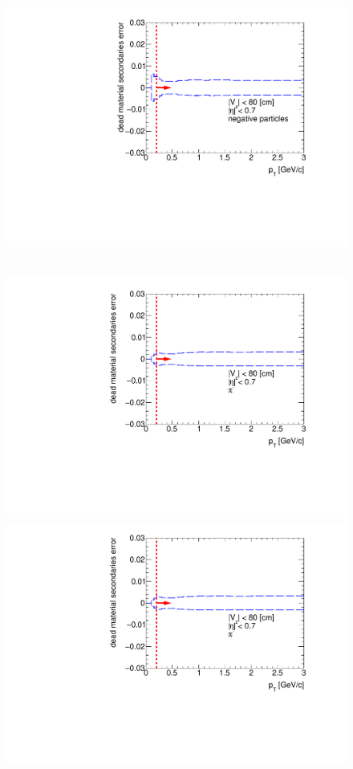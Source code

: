 \begin{figure}[hb]
{  \includegraphics[width=\linewidth,page=1]{graphics/systematicsEfficiency/deadMaterial/secondaries_Unbinned_Charged_SDCD1D.pdf}\\
}~
\parbox{0.49\textwidth}{
  \centering
  \includegraphics[width=\linewidth,page=4]{graphics/systematicsEfficiency/deadMaterial/secondaries_Unbinned_SDCD_1D.pdf}\\
  \includegraphics[width=\linewidth,page=5]{graphics/systematicsEfficiency/deadMaterial/secondaries_Unbinned_SDCD_1D.pdf}\\
}
\end{figure}
